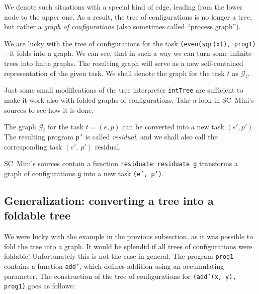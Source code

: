 We denote such situations with a special kind of edge, leading from the lower node to the upper one.
As a result, the tree of configurations is no longer a tree, but rather a \emph{graph of configurations}
(also sometimes called ``process graph'').

We are lucky with the tree of configurations for the task \texttt{(even(sqr(x)), prog1)} -- it folds into a 
graph.
We can see, that in such a way we can turn some infinite trees into finite graphs. 
The resulting graph will serve as a new self-contained representation of the given task.
We shall denote the graph for the task $t$ as $\mathcal{G}_t$.

\begin{exercise}
Just some small modifications of the tree interpreter \texttt{intTree} are sufficient to make
it work also with folded graphs of configurations. Take a look in SC~Mini's sources to see how it is done.
\end{exercise}

The graph $\mathcal{G}_t$ for the task $t = (e, p)$ can be converted into a new task $(e', p')$.
The resulting program \texttt{p'} is called \emph{residual}, and we shall also call
the corresponding task $(e',~p')$ residual.

\begin{exercise}
SC~Mini's sources contain a function \texttt{residuate}: \texttt{residuate g} transforms
a graph of configurations \texttt{g} into a new task \texttt{(e',~p')}.
\end{exercise}

\subsection{Generalization: converting a tree into a foldable tree}

We were lucky with the example in the previous subsection, as it was possible to fold the tree into a graph.
It would be splendid if all trees of configurations were foldable! 
Unfortunately this is not the case in general.
The program \texttt{prog1} contains a function \texttt{add'}, which defines
addition using an accumulating parameter.
The construction of the tree of configurations for \texttt{(add'(x, y), prog1)} goes as follows:\\



